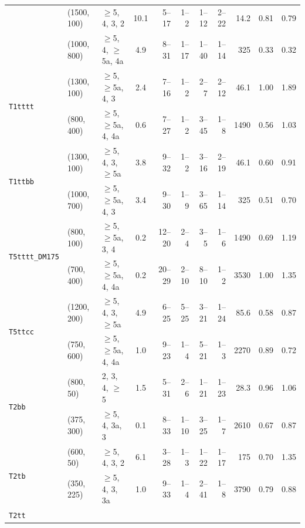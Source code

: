 \begin{table}[!t]
{\begin{tabular}{ lllcrrrrrcc }
    & (1500, 100) & $\geq$5, 4, 3, 2         & 10.1           & 5--17  & 1--2     & 1--12  & 2--22 & 14.2 & 0.81 & 0.79 \\
    & (1000, 800) & $\geq$5, 4, $\geq$5a, 4a & \phantom{1}4.9 & 8--31  & 1--17    & 1--40  & 1--14 & 325  & 0.33 & 0.32 \\ [0.5ex]
      \multirow{2}{*}{\texttt{T1tttt}}
    & (1300, 100) & $\geq$5, $\geq$5a, 4, 3  & \phantom{1}2.4 & 7--16  & 1--2     & 2--7   & 2--12 & 46.1 & 1.00 & 1.89 \\
    & (800, 400)  & $\geq$5, $\geq$5a, 4, 4a & \phantom{1}0.6 & 7--27  & 1--2     & 3--45  & 1--8  & 1490 & 0.56 & 1.03 \\ [0.5ex]
      \multirow{2}{*}{\texttt{T1ttbb}}
    & (1300, 100) & $\geq$5, 4, 3, $\geq$5a  & \phantom{1}3.8 & 9--32  & 1--2     & 3--16  & 2--19 & 46.1 & 0.60 & 0.91 \\
    & (1000, 700) & $\geq$5, $\geq$5a, 4, 3  & \phantom{1}3.4 & 9--30  & 1--9     & 3--65  & 1--14 & 325  & 0.51 & 0.70 \\ [0.5ex]
      \multirow{2}{*}{\texttt{T5tttt\_DM175}}
    & (800, 100)  & $\geq$5, $\geq$5a, 3, 4  & \phantom{1}0.2 & 12--20 & 2--4     & 3--5   & 1--6  & 1490 & 0.69 & 1.19 \\
    & (700, 400)  & $\geq$5, $\geq$5a, 4, 4a & \phantom{1}0.2 & 20--29 & 2--10    & 8--10  & 1--2  & 3530 & 1.00 & 1.35 \\ [0.5ex]
      \multirow{2}{*}{\texttt{T5ttcc}}
    & (1200, 200) & $\geq$5, 4, 3, $\geq$5a  & \phantom{1}4.9 & 6--25  & 5--25    & 3--21  & 1--24 & 85.6 & 0.58 & 0.87 \\
    & (750, 600)  & $\geq$5, $\geq$5a, 4, 4a & \phantom{1}1.0 & 9--23  & 1--4     & 5--21  & 1--3  & 2270 & 0.89 & 0.72 \\ [0.5ex]
      \multirow{2}{*}{\texttt{T2bb}}
    & (800, 50)   & 2, 3, 4, $\geq$5         & \phantom{1}1.5 & 5--31  & 2--6     & 1--21  & 1--23 & 28.3 & 0.96 & 1.06 \\
    & (375, 300)  & $\geq$5, 4, 3a, 3        & \phantom{1}0.1 & 8--33  & 1--10    & 3--25  & 1--7  & 2610 & 0.67 & 0.87 \\ [0.5ex]
      \multirow{2}{*}{\texttt{T2tb}}
    & (600, 50)   & $\geq$5, 4, 3, 2         & \phantom{1}6.1 & 3--28  & 1--3     & 1--22  & 1--17 & 175  & 0.70 & 1.35 \\
    & (350, 225)  & $\geq$5, 4, 3, 3a        & \phantom{1}1.0 & 9--33  & 1--4     & 2--41  & 1--8  & 3790 & 0.79 & 0.88 \\ [0.5ex]
      \multirow{2}{*}{\texttt{T2tt}}

\end{tabular}}
\end{table}
